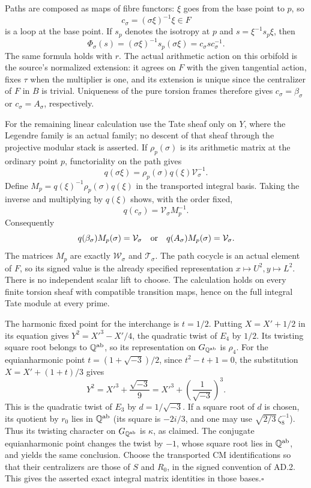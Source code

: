 Paths are composed as maps of fibre functors: $\xi$ goes from
the base point to $p$, so
\[
 c_\sigma=(\sigma\xi)^{-1}\xi\in F
\]
is a loop at the base point.  If $s_p$ denotes the isotropy at
$p$ and $s=\xi^{-1}s_p\xi$, then
\[
 \Phi_\sigma(s)=(\sigma\xi)^{-1}s_p(\sigma\xi)
                  =c_\sigma s c_\sigma^{-1}.
\]
The same formula holds with $r$.  The actual arithmetic action
on this orbifold is the source's normalized extension: it agrees
on $F$ with the given tangential action, fixes $\tau$ when the
multiplier is one, and its extension is unique since the
centralizer of $F$ in $B$ is trivial.  Uniqueness of the pure
torsion frames therefore gives $c_\sigma=\beta_\sigma$ or
$c_\sigma=A_\sigma$, respectively.

For the remaining linear calculation use the Tate sheaf only on
$Y$, where the Legendre family is an actual family; no descent of
that sheaf through the projective modular stack is asserted.
If $\rho_p(\sigma)$ is its arithmetic matrix at the ordinary
point $p$, functoriality on the path gives
\[
 q(\sigma\xi)=\rho_p(\sigma)q(\xi)\mathcal V_\sigma^{-1}.
\]
Define $M_p=q(\xi)^{-1}\rho_p(\sigma)q(\xi)$ in the
transported integral basis.  Taking the inverse and multiplying
by $q(\xi)$ shows, with the order fixed,
\[
 q(c_\sigma)=\mathcal V_\sigma M_p^{-1}.
\]
Consequently
\[
 q(\beta_\sigma)M_p(\sigma)=\mathcal V_\sigma
 \quad\hbox{or}\quad
 q(A_\sigma)M_p(\sigma)=\mathcal V_\sigma.
\]
The matrices $M_p$ are exactly $\mathcal W_\sigma$ and
$\mathcal T_\sigma$.  The path cocycle is an actual element of
$F$, so its signed value is the already specified representation
$x\mapsto U^2,y\mapsto L^2$.  There is no independent scalar
lift to choose.  The calculation holds on every finite torsion
sheaf with compatible transition maps, hence on the full integral
Tate module at every prime.

The harmonic fixed point for the interchange is $t=1/2$.
Putting $X=X'+1/2$ in its equation gives
$Y^2=X'^3-X'/4$, the quadratic twist of $E_4$ by $1/2$.
Its twisting square root belongs to $\mathbb Q^{\rm ab}$, so
its representation on $G_{\mathbb Q^{\rm ab}}$ is $\rho_4$.
For the equianharmonic point $t=(1+\sqrt{-3})/2$, since
$t^2-t+1=0$, the substitution
$X=X'+(1+t)/3$ gives
\[
 Y^2=X'^3+\frac{\sqrt{-3}}9
      =X'^3+\left(\frac1{\sqrt{-3}}\right)^3.
\]
This is the quadratic twist of $E_3$ by $d=1/\sqrt{-3}$.
If a square root of $d$ is chosen, its quotient by $r_0$ lies
in $\mathbb Q^{\rm ab}$ (its square is $-2i/3$, and one may
use $\sqrt{2/3}\,\zeta_8^{-1}$).  Thus its twisting character
on $G_{\mathbb Q^{\rm ab}}$ is $\kappa$, as claimed.
The conjugate equianharmonic point changes the twist by $-1$,
whose square root lies in $\mathbb Q^{\rm ab}$, and yields the
same conclusion.  Choose the transported CM identifications
so that their centralizers are those of $S$ and $R_0$, in the
signed convention of AD.2.  This gives the asserted exact
integral matrix identities in those bases.\hfill$\square$

